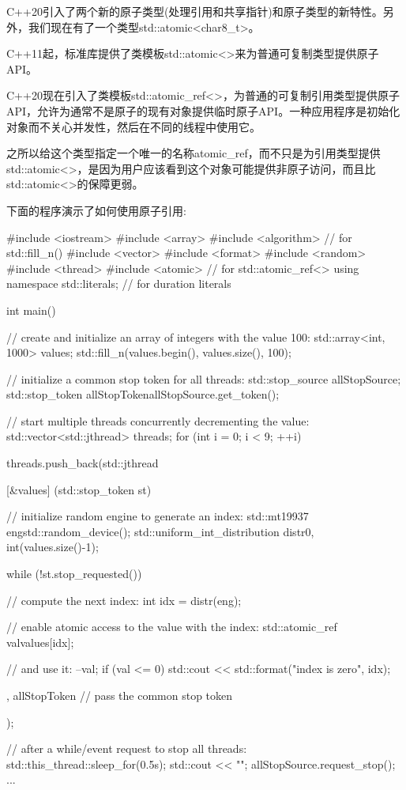 

C++20引入了两个新的原子类型(处理引用和共享指针)和原子类型的新特性。另外，我们现在有了一个类型std::atomic<char8\_t>。


C++11起，标准库提供了类模板std::atomic<>来为普通可复制类型提供原子API。

C++20现在引入了类模板std::atomic\_ref<>，为普通的可复制引用类型提供原子API，允许为通常不是原子的现有对象提供临时原子API。一种应用程序是初始化对象而不关心并发性，然后在不同的线程中使用它。

之所以给这个类型指定一个唯一的名称atomic\_ref，而不只是为引用类型提供std::atomic<>，是因为用户应该看到这个对象可能提供非原子访问，而且比std::atomic<>的保障更弱。


下面的程序演示了如何使用原子引用:


\begin{cpp}
#include <iostream>
#include <array>
#include <algorithm> // for std::fill_n()
#include <vector>
#include <format>
#include <random>
#include <thread>
#include <atomic> // for std::atomic_ref<>
using namespace std::literals; // for duration literals

int main()
{
	// create and initialize an array of integers with the value 100:
	std::array<int, 1000> values;
	std::fill_n(values.begin(), values.size(), 100);
	
	// initialize a common stop token for all threads:
	std::stop_source allStopSource;
	std::stop_token allStopToken{allStopSource.get_token()};
	
	// start multiple threads concurrently decrementing the value:
	std::vector<std::jthread> threads;
	for (int i = 0; i < 9; ++i) {
		threads.push_back(std::jthread{
			[&values] (std::stop_token st) {
				// initialize random engine to generate an index:
				std::mt19937 eng{std::random_device{}()};
				std::uniform_int_distribution distr{0, int(values.size()-1)};
				
				while (!st.stop_requested()) {
					// compute the next index:
					int idx = distr(eng);
					
					// enable atomic access to the value with the index:
					std::atomic_ref val{values[idx]};
					
					// and use it:
					--val;
					if (val <= 0) {
						std::cout << std::format("index {} is zero\n", idx);
					}
				}
			},
			allStopToken // pass the common stop token
		});
	}
	
	// after a while/event request to stop all threads:
	std::this_thread::sleep_for(0.5s);
	std::cout << "\nSTOP\n";
	allStopSource.request_stop();
	...
}
\end{cpp}

